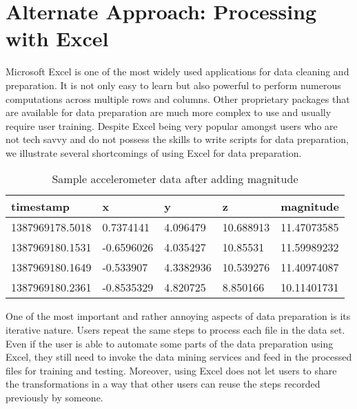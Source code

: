 \section{Alternate Approach: Processing with Excel}

Microsoft Excel is one of the most widely used applications for data cleaning and preparation. It is not only easy to learn but also powerful to perform numerous computations across multiple rows and columns. Other proprietary packages that are available for data preparation are much more complex to use and usually require  user training. Despite Excel being very popular amongst users who are not tech savvy and do not possess the skills to write scripts for data preparation, we illustrate several shortcomings of using Excel for data preparation. 

\begin{table}[h]
	\centering	
	\caption{Sample accelerometer data after adding magnitude\label{tab:sample_data_acce}}
  	\begin{tabular}{ | p{2cm} | p{1.3cm} | p{1cm} | p{1cm} | p{1.5cm} | }
    	\hline
	    \textbf{timestamp} & \textbf{x} & \textbf{y} & \textbf{z} & \textbf{magnitude} \\ \hline
		1387969178.5018 & 0.7374141 & 4.096479 & 10.688913 & 11.47073585 \\ \hline
		1387969180.1531 & -0.6596026 & 4.035427 & 10.85531 & 11.59989232 \\ \hline
		1387969180.1649 & -0.533907 & 4.3382936 & 10.539276 & 11.40974087 \\ \hline
		1387969180.2361 & -0.8535329 & 4.820725 & 8.850166 & 10.11401731 \\
	    \hline
  	\end{tabular}
\end{table}

One of the most important and rather annoying aspects of data preparation is its iterative nature. Users repeat the same steps to process each file in the data set. Even if the user is able to automate some parts of the data preparation using Excel, they still need to invoke the data mining services and feed in the processed files for training and testing. Moreover, using Excel does not let users to share the transformations in a way that other users can reuse the steps recorded previously by someone. 

